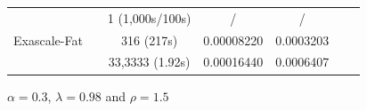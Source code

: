 \begin{frame}
\begin{center}
{\begin{tabular}{|c|c|c|c|c|c|c|}
         		& \CSCI   	& 1 (1,000s/100s)		& / 				& /  \\
Exascale-Fat	& \CSHI 	& 316 (217s)  			& 0.00008220        & 0.0003203 \\ 
         		& \CSHP 	& 33,3333 (1.92s)		& 0.00016440    	& 0.0006407 \\\hline
\end{tabular}}

$\alpha = 0.3$, $\lambda = 0.98$ and $\rho = 1.5$
\end{center}

\end{frame}




